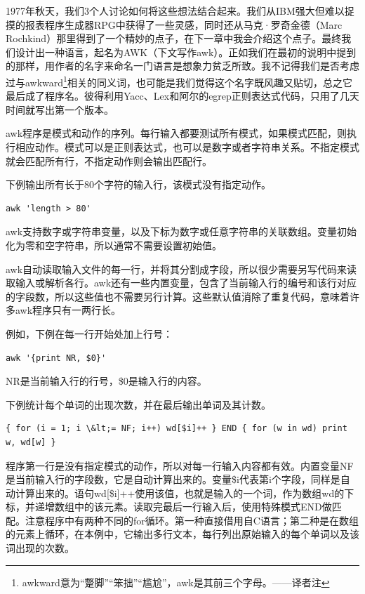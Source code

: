 \documentclass[a4paper,12pt,UTF8,twoside]{ctexbook}
\begin{document}
1977年秋天，我们3个人讨论如何将这些想法结合起来。我们从IBM强大但难以捉摸的报表程序生成器RPG中获得了一些灵感，同时还从马克·罗奇金德（Marc Rochkind）那里得到了一个精妙的点子，在下一章中我会介绍这个点子。最终我们设计出一种语言，起名为AWK（下文写作awk）。正如我们在最初的说明中提到的那样，用作者的名字来命名一门语言是想象力贫乏所致。我不记得我们是否考虑过与awkward\footnote{awkward意为“蹩脚”“笨拙”“尴尬”，awk是其前三个字母。——译者注}相关的同义词，也可能是我们觉得这个名字既风趣又贴切，总之它最后成了程序名。彼得利用Yacc、Lex和阿尔的egrep正则表达式代码，只用了几天时间就写出第一个版本。

awk程序是模式和动作的序列。每行输入都要测试所有模式，如果模式匹配，则执行相应动作。模式可以是正则表达式，也可以是数字或者字符串关系。不指定模式就会匹配所有行，不指定动作则会输出匹配行。

下例输出所有长于80个字符的输入行，该模式没有指定动作。

\begin{lstlisting}
awk 'length > 80'
\end{lstlisting}

awk支持数字或字符串变量，以及下标为数字或任意字符串的关联数组。变量初始化为零和空字符串，所以通常不需要设置初始值。

awk自动读取输入文件的每一行，并将其分割成字段，所以很少需要另写代码来读取输入或解析各行。awk还有一些内置变量，包含了当前输入行的编号和该行对应的字段数，所以这些值也不需要另行计算。这些默认值消除了重复代码，意味着许多awk程序只有一两行长。

例如，下例在每一行开始处加上行号：

\begin{lstlisting}
awk '{print NR, $0}'
\end{lstlisting}

NR是当前输入行的行号，\$0是输入行的内容。

下例统计每个单词的出现次数，并在最后输出单词及其计数。

\begin{lstlisting}
{ for (i = 1; i \&lt;= NF; i++) wd[$i]++ } END { for (w in wd) print w, wd[w] }
\end{lstlisting}

程序第一行是没有指定模式的动作，所以对每一行输入内容都有效。内置变量NF是当前输入行的字段数，它是自动计算出来的。变量\$i代表第i个字段，同样是自动计算出来的。语句wd[\$i]++使用该值，也就是输入的一个词，作为数组wd的下标，并递增数组中的该元素。读取完最后一行输入后，使用特殊模式END做匹配。注意程序中有两种不同的for循环。第一种直接借用自C语言；第二种是在数组的元素上循环，在本例中，它输出多行文本，每行列出原始输入的每个单词以及该词出现的次数。
\end{document}
